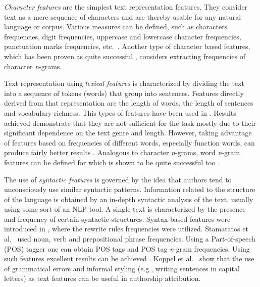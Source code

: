 \documentclass{llncs}
\begin{document}
\emph{Character features} are the simplest text representation features. They
consider text as a mere sequence of characters and are thereby usable for any
natural language or corpus. Various measures can be defined, such as
characters frequencies, digit frequencies, uppercase and lowercase character
frequencies, punctuation marks frequencies, etc.\ \cite{de2001mining}. Another
type of character based features, which has been proven as quite successful
\cite{peng2003language,stamatatos2006ensemble}, considers extracting
frequencies of character \emph{n}-grams. 

Text representation using \emph{lexical features} is characterized by dividing
the text into a sequence of tokens (words) that group into sentences. Features
directly derived from that representation are the length of words, the
length of sentences and vocabulary richness. This types of features have been used in
\cite{holmes1994authorship,mendenhall1887} . Results achieved demonstrate that
they are not sufficient for the task mostly due to their
significant dependence on the text genre and length. However, taking advantage of
features based on frequencies of different words, especially function words,
can produce fairly better results
\cite{argamon2005measuring,koppel2003exploiting,uzuner2005comparative,zhao2005effective}.
Analogous to character \emph{n}-grams, word \emph{n}-gram features
can be defined for which is shown to be quite successful too
\cite{coyotl2006authorship,keselj2003n}.

The use of \emph{syntactic features} is governed by the idea that authors tend to
unconsciously use similar syntactic patterns. Information related to the
structure of the language is obtained by an in-depth syntactic analysis of the
text, usually using some sort of an NLP tool. A single text is characterized by
the presence and frequency of certain syntactic structures. Syntax-based features
were introduced in \cite{van1996outside}, where the rewrite rules frequencies
were utilized. Stamatatos et al.\ \cite{stamatatos2001computer} used noun, verb
and prepositional phrase frequencies. Using a Part-of-speech (POS) tagger one can
obtain POS tags and POS tag \emph{n}-gram frequencies. Using such features
excellent results can be achieved
\cite{diederich2003authorship,koppel2003exploiting,kukushkina2001using,luyckx2005shallow}.
Koppel et al.\ \cite{koppel2003exploiting} show that the use of grammatical
errors and informal styling (e.g., writing sentences in capital letters) as text features
can be useful in authorship attribution.
\end{document}
